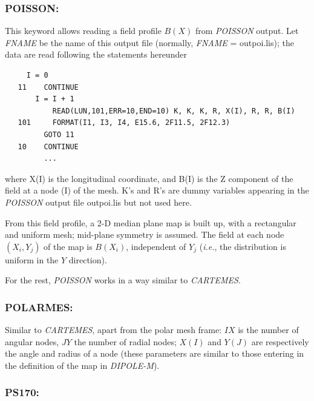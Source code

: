 \newpage

\subsubsection*{POISSON:\POISSONTitl} \label{POISSON} 

This keyword allows reading a field profile $ B(X) $ from  \textsl{POISSON} output. 
Let \textsl{FNAME} be the name of this output file (normally,
\textsl{FNAME} = outpoi.lis); 
the data are read following the \FORTRAN statements hereunder 

{\footnotesize
\begin{verbatim}
	 I = 0
   11    CONTINUE
	   I = I + 1
           READ(LUN,101,ERR=10,END=10) K, K, K, R, X(I), R, R, B(I) 
   101     FORMAT(I1, I3, I4, E15.6, 2F11.5, 2F12.3)
         GOTO 11     
   10    CONTINUE
         ...
\end{verbatim}}
\medskip
 
\noindent where X(I) is the longitudinal coordinate, and B(I) is the Z
component of the field at a node (I) of the mesh. K's and R's are dummy variables 
appearing in the \textsl{POISSON} output file outpoi.lis
 but not used here. 
\bigskip

\noindent From this field profile, a 2-D median plane map is built up, with a 
rectangular and uniform mesh; mid-plane symmetry is assumed. The field at 
each node $ (X_i,Y_j) $ of the map is $ B(X_i) $, independent of $ Y_j $
(\emph{i.e.}, the distribution is uniform in the $ Y $ direction).  
\bigskip

\noindent For the rest, \textsl{POISSON} works in a way similar to \textsl{CARTEMES}. 

\newpage
\subsubsection*{POLARMES: \POLARMESTitl} \label{POLARMES} 

Similar to \textsl{CARTEMES}, apart from the polar 
mesh frame: $IX$ is the number of angular nodes, $JY$ the number of 
radial nodes; $X(I)$ and $Y(J)$ are respectively the angle and radius 
of a node (these parameters are similar to those entering in the 
definition of the map in \textsl{DIPOLE-M}).

\newpage

\subsubsection*{PS170: \PSusoTitl} \label{PS170} 

